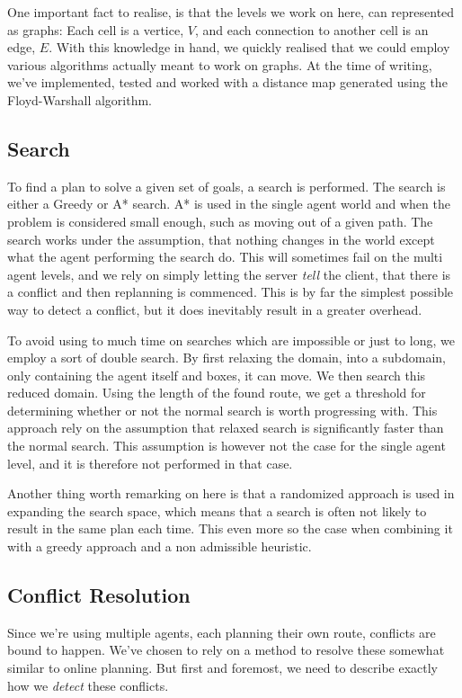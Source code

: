 \documentclass[letterpaper]{article}
\begin{document}
		One important fact to realise, is that the levels we work on here, can represented as graphs: Each cell is a vertice, $V$, and each connection to another cell is an edge, $E$. With this knowledge in hand, we quickly realised that we could employ various algorithms actually meant to work on graphs. At the time of writing, we've implemented, tested and worked with a distance map generated using the Floyd-Warshall algorithm.

	\subsection{Search}
		\label{sec:search}
		To find a plan to solve a given set of goals, a search is performed. The search is either a Greedy or A* search. A* is used in the single agent world and when the problem is considered small enough, such as moving out of a given path. 
		The search works under the assumption, that nothing changes in the world except what the agent performing the search do. This will sometimes fail on the multi agent levels, and we rely on simply letting the server \emph{tell} the client, that there is a conflict and then replanning is commenced. This is by far the simplest possible way to detect a conflict, but it does inevitably result in a greater overhead. 
		
		
		To avoid using to much time on searches which are impossible or just to long, we employ a sort of double search. By first relaxing the domain, into a subdomain, only containing the agent itself and boxes, it can move. We then search this reduced domain. Using the length of the found route, we get a threshold for determining whether or not the normal search is worth progressing with. This approach rely on the assumption that relaxed search is significantly faster than the normal search. This assumption is however not the case for the single agent level, and it is therefore not performed in that case.
		
		
		
		
		Another thing worth remarking on here is that a randomized approach is used in expanding the search space, which means that a search is often not likely to result in the same plan each time. This even more so the case when combining it with a greedy approach and a non admissible heuristic.




	\subsection{Conflict Resolution}
		Since we're using multiple agents, each planning their own route, conflicts are bound to happen. We've chosen to rely on a method to resolve these somewhat similar to online planning. But first and foremost, we need to describe exactly how we \emph{detect} these conflicts.
\end{document}
